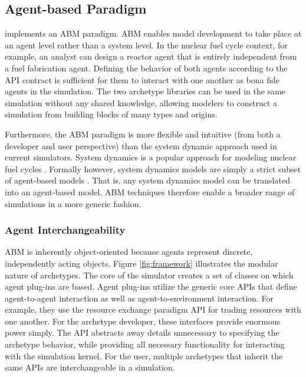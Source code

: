 \subsection{Agent-based Paradigm}
\label{sec:abm}

\Cyclus implements an \acrlong{ABM} paradigm. \gls{ABM} enables model
development to take place at an agent level rather than a system level. In the
nuclear fuel cycle context, for example, an analyst can design a reactor agent
that is entirely independent from a fuel fabrication agent. Defining the
behavior of both agents according to the
\gls{API} contract is sufficient for them to interact with one another as
bona fide agents in the simulation.  The two archetype libraries can be used in
the same simulation without any shared knowledge, allowing modelers to
construct a simulation from building blocks of many types and origins.

Furthermore, the \gls{ABM} paradigm is more flexible and intuitive (from both a developer and user perspective) than the system dynamic approach used in current simulators.
System dynamics is a popular approach for modeling nuclear fuel cycles
\cite{jacobson_vision_2009,van_den_durpel_daness_2009,guerin_impact_2009,guerin_benchmark_2009}.
Formally however, system dynamics models are simply a strict subset of agent-based models
\cite{macal_agent-based_2010}.
That is, any system dynamics model can be translated
into an agent-based model.
\gls{ABM} techniques therefore enable a broader range of simulations in a more
generic fashion.

\subsubsection{Agent Interchangeability}\label{sec:interchangeability}


\gls{ABM} is inherently object-oriented because agents represent discrete,
independently acting objects.  Figure \ref{fig:framework} illustrates the
modular nature of \Cyclus archetypes.  The core of the \Cyclus simulator creates
a set of classes on which agent plug-ins are based.  Agent plug-ins utilize the
generic core \glspl{API} that define agent-to-agent interaction as well as agent-to-environment interaction.
For example, they use the
resource exchange paradigm \gls{API} for trading resources with one another.  
For the archetype developer, these interfaces provide enormous power
simply. The \gls{API} abstracts away details unnecessary to specifying the 
archetype behavior, while providing
all necessary functionality for interacting with the \Cyclus simulation kernel.
For the user, multiple archetypes that inherit the same \glspl{API} are interchangeable
in a simulation.

